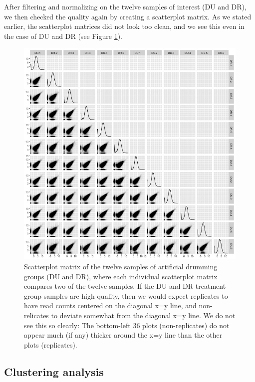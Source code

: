 \documentclass[11pt,a4paper,oldfontcommands,openany]{memoir}
\numberwithin{equation}{section} %
\begin{document}
After filtering and normalizing on the twelve samples of interest (DU and DR), we then checked the quality again by creating a scatterplot matrix. As we stated earlier, the scatterplot matrices did not look too clean, and we see this even in the case of DU and DR (see Figure \ref{fig:scatMatPW}).

\begin{figure}[H]
    \begin{framed}
    \centering
    \includegraphics[width=\textwidth]{scatMatPW}
    \end{framed}
    \caption{Scatterplot matrix of the twelve samples of artificial drumming groups (DU and DR), where each individual scatterplot matrix compares two of the twelve samples. If the DU and DR treatment group samples are high quality, then we would expect replicates to have read counts centered on the diagonal x=y line, and non-relicates to deviate somewhat from the diagonal x=y line. We do not see this so clearly: The bottom-left 36 plots (non-replicates) do not appear much (if any) thicker around the x=y line than the other plots (replicates).}
    \label{fig:scatMatPW}
\end{figure}

\subsection{Clustering analysis}
\end{document}
